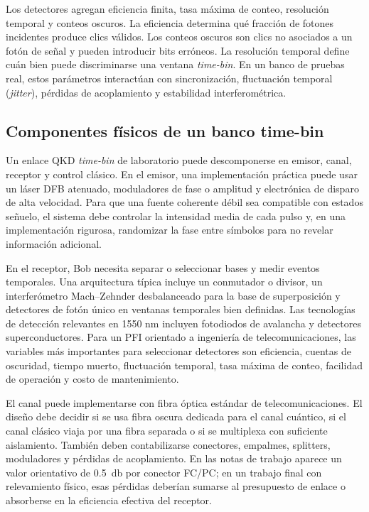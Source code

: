 Los detectores agregan eficiencia finita, tasa máxima de conteo, resolución temporal y conteos oscuros. La eficiencia determina qué fracción de fotones incidentes produce clics válidos. Los conteos oscuros son clics no asociados a un fotón de señal y pueden introducir bits erróneos. La resolución temporal define cuán bien puede discriminarse una ventana \textit{time-bin}. En un banco de pruebas real, estos parámetros interactúan con sincronización, fluctuación temporal (\textit{jitter}), pérdidas de acoplamiento y estabilidad interferométrica.

\subsection{Componentes físicos de un banco time-bin}

Un enlace QKD \textit{time-bin} de laboratorio puede descomponerse en emisor, canal, receptor y control clásico. En el emisor, una implementación práctica puede usar un láser DFB atenuado, moduladores de fase o amplitud y electrónica de disparo de alta velocidad. Para que una fuente coherente débil sea compatible con estados señuelo, el sistema debe controlar la intensidad media de cada pulso y, en una implementación rigurosa, randomizar la fase entre símbolos para no revelar información adicional.

En el receptor, Bob necesita separar o seleccionar bases y medir eventos temporales. Una arquitectura típica incluye un conmutador o divisor, un interferómetro Mach--Zehnder desbalanceado para la base de superposición y detectores de fotón único en ventanas temporales bien definidas. Las tecnologías de detección relevantes en 1550 nm incluyen fotodiodos de avalancha y detectores superconductores. Para un PFI orientado a ingeniería de telecomunicaciones, las variables más importantes para seleccionar detectores son eficiencia, cuentas de oscuridad, tiempo muerto, fluctuación temporal, tasa máxima de conteo, facilidad de operación y costo de mantenimiento.

El canal puede implementarse con fibra óptica estándar de telecomunicaciones. El diseño debe decidir si se usa fibra oscura dedicada para el canal cuántico, si el canal clásico viaja por una fibra separada o si se multiplexa con suficiente aislamiento. También deben contabilizarse conectores, empalmes, splitters, moduladores y pérdidas de acoplamiento. En las notas de trabajo aparece un valor orientativo de \SI{0.5}{\decibel} por conector FC/PC; en un trabajo final con relevamiento físico, esas pérdidas deberían sumarse al presupuesto de enlace o absorberse en la eficiencia efectiva del receptor.
